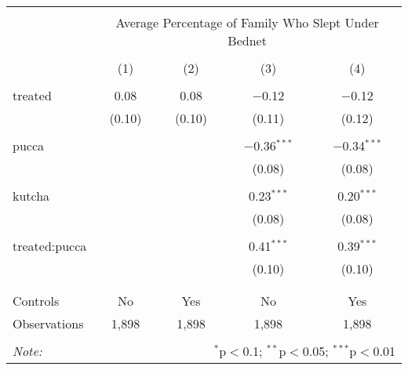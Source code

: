 
\begin{table}[!htbp] \centering 
  \caption{} 
  \label{} 
\begin{tabular}{@{\extracolsep{5pt}}lcccc} 
\\[-1.8ex]\hline 
\hline \\[-1.8ex] 
 & \multicolumn{4}{c}{Average Percentage of Family Who Slept Under Bednet} \\ 
\cline{2-5} 
\\[-1.8ex] & (1) & (2) & (3) & (4)\\ 
\hline \\[-1.8ex] 
 treated & 0.08 & 0.08 & $-$0.12 & $-$0.12 \\ 
  & (0.10) & (0.10) & (0.11) & (0.12) \\ 
  & & & & \\ 
 pucca &  &  & $-$0.36$^{***}$ & $-$0.34$^{***}$ \\ 
  &  &  & (0.08) & (0.08) \\ 
  & & & & \\ 
 kutcha &  &  & 0.23$^{***}$ & 0.20$^{***}$ \\ 
  &  &  & (0.08) & (0.08) \\ 
  & & & & \\ 
 treated:pucca &  &  & 0.41$^{***}$ & 0.39$^{***}$ \\ 
  &  &  & (0.10) & (0.10) \\ 
  & & & & \\ 
\hline \\[-1.8ex] 
Controls & No & Yes & No & Yes \\ 
Observations & 1,898 & 1,898 & 1,898 & 1,898 \\ 
\hline 
\hline \\[-1.8ex] 
\textit{Note:}  & \multicolumn{4}{r}{$^{*}$p$<$0.1; $^{**}$p$<$0.05; $^{***}$p$<$0.01} \\ 
\end{tabular} 
\end{table} 
